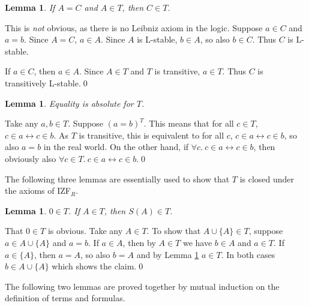\documentclass{LMCS}
\newtheorem{lemma}[thm]{Lemma}
\newcommand\iffl{\ensuremath{\leftrightarrow}}
\newcommand{\izfr}{IZF${}_R$}
\begin{document}
\begin{lemma}\label{t1}
If $A=C$ and $A \in T$, then $C \in T$. 
\end{lemma}
\proof This is \emph{not} obvious, as there is no Leibniz axiom in the logic. 
Suppose $a \in C$ and $a = b$. Since $A=C$, $a \in A$. Since $A$ is L-stable, $b \in A$, so also $b \in C$. Thus $C$ is L-stable. 

If $a \in C$, then $a \in A$. Since $A \in T$ and $T$ is transitive, $a
\in T$. Thus $C$ is transitively L-stable.\qed


\begin{lemma}
Equality is absolute for $T$.
\end{lemma}
\proof Take any $a, b \in T$. Suppose $(a = b)^T$. This means that for all $c \in T$,
$c \in a \iffl c \in b$. As $T$ is transitive, this is equivalent to for all
$c$, $c \in a \iffl c \in b$, so also $a = b$ in the real world. On the
other hand, if $\forall c.\ c \in a \iffl c \in b$, then obviously also
$\forall c \in T.\ c \in a \iffl c \in b$.\qed


The following three lemmas are essentially used to show that $T$ is closed
under the axioms of \izfr. 

\begin{lemma}\label{omegat}
$0 \in T$. If $A \in T$, then $S(A) \in T$. 
\end{lemma}
\proof That $0 \in T$ is obvious. Take any $A \in T$. To show that $A \cup \{ A \}
\in T$, suppose $a \in A \cup \{ A \}$ and $a = b$. If $a \in A$, then by $A
\in T$ we have $b \in A$ and $a \in T$. If $a \in \{ A \}$, then $a = A$, so
also $b = A$ and by Lemma \ref{t1} $a \in T$. In both cases $b \in A \cup \{
A \}$ which shows the claim.\qed


The following two lemmas are proved together by mutual induction on the
definition of terms and formulas. 
\end{document}
